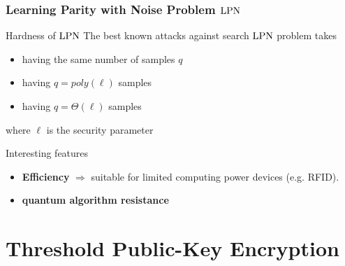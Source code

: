 \begin{frame}
 \frametitle{Learning Parity with Noise Problem $\mathrm{LPN}$}

  \begin{block}{Hardness of $\mathrm{LPN}$}
  The best known attacks against search $\mathrm{LPN}$ problem takes
  



   \begin{itemize}[<+->]
    \item {} having the same number of samples $q$
    \item {} having $q=poly(\ell)$ samples
    \item {} having $q= \mathcal{\varTheta}(\ell)$ samples
   \end{itemize} 
where $\ell$ is the security parameter
  \end{block}
  
  \begin{block}{Interesting features}
    \begin{itemize}
      \item<4-> \textbf{Efficiency} $\Rightarrow$ suitable for limited computing power devices (e.g. RFID).
      \item<5-> \textbf{quantum algorithm resistance}
    \end{itemize}
  \end{block}

\end{frame}

\section{Threshold Public-Key Encryption}

